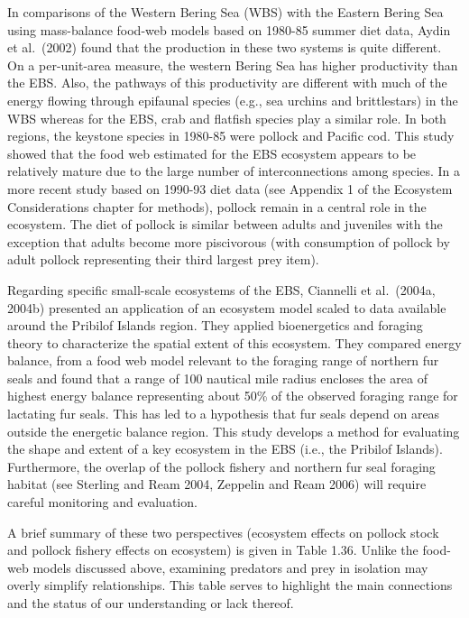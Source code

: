 In comparisons of the Western Bering Sea (WBS) with the Eastern Bering
Sea using mass-balance food-web models based on 1980-85 summer diet
data, Aydin et al.~(2002) found that the production in these two systems
is quite different. On a per-unit-area measure, the western Bering Sea
has higher productivity than the EBS. Also, the pathways of this
productivity are different with much of the energy flowing through
epifaunal species (e.g., sea urchins and brittlestars) in the WBS
whereas for the EBS, crab and flatfish species play a similar role. In
both regions, the keystone species in 1980-85 were pollock and Pacific
cod. This study showed that the food web estimated for the EBS ecosystem
appears to be relatively mature due to the large number of
interconnections among species. In a more recent study based on 1990-93
diet data (see Appendix 1 of the Ecosystem Considerations chapter for
methods), pollock remain in a central role in the ecosystem. The diet of
pollock is similar between adults and juveniles with the exception that
adults become more piscivorous (with consumption of pollock by adult
pollock representing their third largest prey item).

Regarding specific small-scale ecosystems of the EBS, Ciannelli et
al.~(2004a, 2004b) presented an application of an ecosystem model scaled
to data available around the Pribilof Islands region. They applied
bioenergetics and foraging theory to characterize the spatial extent of
this ecosystem. They compared energy balance, from a food web model
relevant to the foraging range of northern fur seals and found that a
range of 100 nautical mile radius encloses the area of highest energy
balance representing about 50\% of the observed foraging range for
lactating fur seals. This has led to a hypothesis that fur seals depend
on areas outside the energetic balance region. This study develops a
method for evaluating the shape and extent of a key ecosystem in the EBS
(i.e., the Pribilof Islands). Furthermore, the overlap of the pollock
fishery and northern fur seal foraging habitat (see Sterling and Ream
2004, Zeppelin and Ream 2006) will require careful monitoring and
evaluation.

A brief summary of these two perspectives (ecosystem effects on pollock
stock and pollock fishery effects on ecosystem) is given in Table 1.36.
Unlike the food-web models discussed above, examining predators and prey
in isolation may overly simplify relationships. This table serves to
highlight the main connections and the status of our understanding or
lack thereof.

